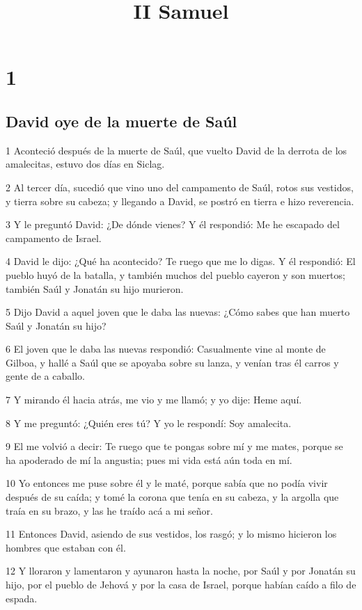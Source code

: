 

\title{II Samuel}

\chapter{1}

\section*{David oye de la muerte de Saúl}

\par 1 Aconteció después de la muerte de Saúl, que vuelto David de la derrota de los amalecitas, estuvo dos días en Siclag.
\par 2 Al tercer día, sucedió que vino uno del campamento de Saúl, rotos sus vestidos, y tierra sobre su cabeza; y llegando a David, se postró en tierra e hizo reverencia.
\par 3 Y le preguntó David: ¿De dónde vienes? Y él respondió: Me he escapado del campamento de Israel.
\par 4 David le dijo: ¿Qué ha acontecido? Te ruego que me lo digas. Y él respondió: El pueblo huyó de la batalla, y también muchos del pueblo cayeron y son muertos; también Saúl y Jonatán su hijo murieron.
\par 5 Dijo David a aquel joven que le daba las nuevas: ¿Cómo sabes que han muerto Saúl y Jonatán su hijo?
\par 6 El joven que le daba las nuevas respondió: Casualmente vine al monte de Gilboa, y hallé a Saúl que se apoyaba sobre su lanza, y venían tras él carros y gente de a caballo.
\par 7 Y mirando él hacia atrás, me vio y me llamó; y yo dije: Heme aquí.
\par 8 Y me preguntó: ¿Quién eres tú? Y yo le respondí: Soy amalecita.
\par 9 El me volvió a decir: Te ruego que te pongas sobre mí y me mates, porque se ha apoderado de mí la angustia; pues mi vida está aún toda en mí.
\par 10 Yo entonces me puse sobre él y le maté, porque sabía que no podía vivir después de su caída; y tomé la corona que tenía en su cabeza, y la argolla que traía en su brazo, y las he traído acá a mi señor. 
\par 11 Entonces David, asiendo de sus vestidos, los rasgó; y lo mismo hicieron los hombres que estaban con él.
\par 12 Y lloraron y lamentaron y ayunaron hasta la noche, por Saúl y por Jonatán su hijo, por el pueblo de Jehová y por la casa de Israel, porque habían caído a filo de espada.
